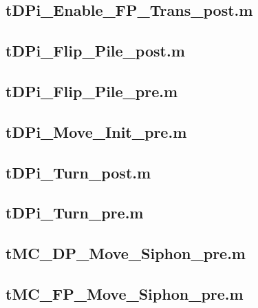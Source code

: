 \documentclass[runningheads,a4paper]{llncs}
\newcommand{\GPenSIM}{../GPenSIM}
\begin{document}
\subsection{tDPi\_Enable\_FP\_Trans\_post.m}
\label{app:tDPi_Enable_FP_Trans_post}


\subsection{tDPi\_Flip\_Pile\_post.m}
\label{app:tDPi_Flip_Pile_post}


\subsection{tDPi\_Flip\_Pile\_pre.m}
\label{app:tDPi_Flip_Pile_pre}


\subsection{tDPi\_Move\_Init\_pre.m}
\label{app:tDPi_Move_Init_pre}


\subsection{tDPi\_Turn\_post.m}
\label{app:tDPi_Turn_post}


\subsection{tDPi\_Turn\_pre.m}
\label{app:tDPi_Turn_pre}


\subsection{tMC\_DP\_Move\_Siphon\_pre.m}
\label{app:tMC_DP_Move_Siphon_pre}


\subsection{tMC\_FP\_Move\_Siphon\_pre.m}
\label{app:tMC_FP_Move_Siphon_pre}

\end{document}
